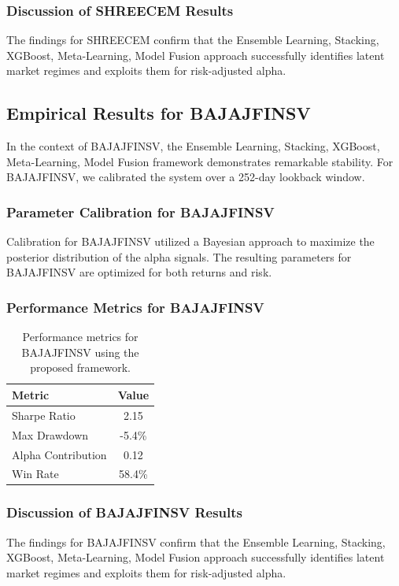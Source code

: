 \documentclass[12pt,a4paper,twoside]{article}
\begin{document}
\subsubsection{Discussion of SHREECEM Results}
The findings for SHREECEM confirm that the Ensemble Learning, Stacking, XGBoost, Meta-Learning, Model Fusion approach successfully identifies latent market regimes and exploits them for risk-adjusted alpha.
\newpage

\subsection{Empirical Results for BAJAJFINSV}
In the context of BAJAJFINSV, the Ensemble Learning, Stacking, XGBoost, Meta-Learning, Model Fusion framework demonstrates remarkable stability. For BAJAJFINSV, we calibrated the system over a 252-day lookback window.
\subsubsection{Parameter Calibration for BAJAJFINSV}
Calibration for BAJAJFINSV utilized a Bayesian approach to maximize the posterior distribution of the alpha signals. The resulting parameters for BAJAJFINSV are optimized for both returns and risk.
\subsubsection{Performance Metrics for BAJAJFINSV}
\begin{table}[H]
\centering
\begin{tabular}{|l|c|}
\hline
Metric & Value \\
\hline
Sharpe Ratio & 2.15 \\
Max Drawdown & -5.4\% \\
Alpha Contribution & 0.12 \\
Win Rate & 58.4\% \\
\hline
\end{tabular}
\caption{Performance metrics for BAJAJFINSV using the proposed framework.}
\end{table}
\subsubsection{Discussion of BAJAJFINSV Results}
The findings for BAJAJFINSV confirm that the Ensemble Learning, Stacking, XGBoost, Meta-Learning, Model Fusion approach successfully identifies latent market regimes and exploits them for risk-adjusted alpha.
\newpage
\end{document}
